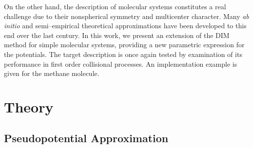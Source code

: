 \documentclass[10pt]{article}
\begin{document}
On the other hand, the description of molecular systems constitutes 
a real challenge due to their nonspherical symmetry and multicenter 
character. Many \textit{ab initio} and semi--empirical theoretical 
approximations \cite{Szabo1996,Helgaker2000,Schaefer2004} have been 
developed to this end over the last century. 
In this work, we present an extension of the DIM method for simple 
molecular systems, providing a new parametric expression for the 
potentials. 
The target description is once again tested by examination of its 
performance in first order collisional processes. 
An implementation example is given for the methane molecule.


\section{Theory}

\subsection{Pseudopotential Approximation}
\label{sec:PPAs}
\end{document}
